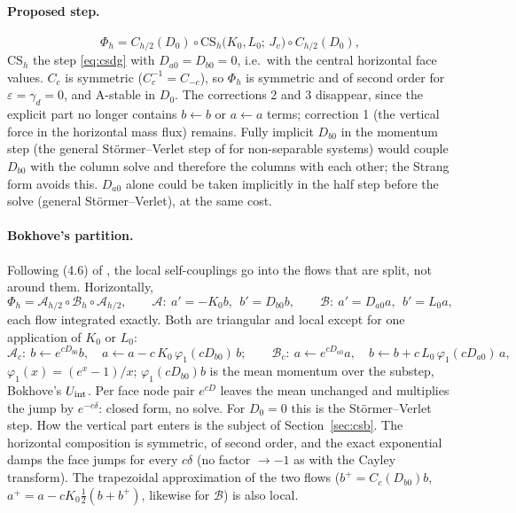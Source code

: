 \documentclass[11pt,a4paper]{article}
\begin{document}
\paragraph{Proposed step.}
\[
\Phi_h=C_{h/2}(D_0)\circ\mathrm{CS}_h\big(K_0,L_0;\,J_v\big)\circ C_{h/2}(D_0),
\]
$\mathrm{CS}_h$ the step \eqref{eq:csdg} with $D_{a0}=D_{b0}=0$, i.e.\ with the central horizontal face values. $C_c$ is
symmetric ($C_c^{-1}=C_{-c}$), so $\Phi_h$ is symmetric and of second order for $\varepsilon=\gamma_d=0$, and A-stable in $D_0$. The
corrections 2 and 3 disappear, since the explicit part no longer contains $b\leftarrow b$ or $a\leftarrow a$ terms; correction 1
(the vertical force in the horizontal mass flux) remains. Fully implicit $D_{b0}$ in the momentum step (the general
Störmer--Verlet step of \cite{hlw} for non-separable systems) would couple $D_{b0}$ with the column solve and therefore the
columns with each other; the Strang form avoids this. $D_{a0}$ alone could be taken implicitly in the half step before
the solve (general Störmer--Verlet), at the same cost.

\paragraph{Bokhove's partition.} Following (4.6) of \cite{xvb}, the local self-couplings go into the flows that are split,
not around them. Horizontally,
\[
\Phi_h=\mathcal A_{h/2}\circ\mathcal B_h\circ\mathcal A_{h/2},\qquad
\mathcal A:\ a'=-K_0b,\ \ b'=D_{b0}b,\qquad
\mathcal B:\ a'=D_{a0}a,\ \ b'=L_0a,
\]
each flow integrated exactly. Both are triangular and local except for one application of $K_0$ or $L_0$:
\[
\mathcal A_c:\ b\leftarrow e^{cD_{b0}}b,\quad a\leftarrow a-c\,K_0\,\varphi_1(cD_{b0})\,b;\qquad
\mathcal B_c:\ a\leftarrow e^{cD_{a0}}a,\quad b\leftarrow b+c\,L_0\,\varphi_1(cD_{a0})\,a,
\]
$\varphi_1(x)=(e^x-1)/x$; $\varphi_1(cD_{b0})b$ is the mean momentum over the substep, Bokhove's $U_{\rm int}$. Per face node pair
$e^{cD}$ leaves the mean unchanged and multiplies the jump by $e^{-c\delta}$: closed form, no solve. For $D_0=0$ this is
the Störmer--Verlet step. How the vertical part enters is the subject of Section~\ref{sec:csb}. The
horizontal composition is symmetric, of second order, and the exact exponential damps the face jumps for every $c\delta$ (no factor
$\to-1$ as with the Cayley transform). The trapezoidal approximation of the two flows ($b^+=C_c(D_{b0})b$,
$a^+=a-cK_0\tfrac12(b+b^+)$, likewise for $\mathcal B$) is also local.
\end{document}
